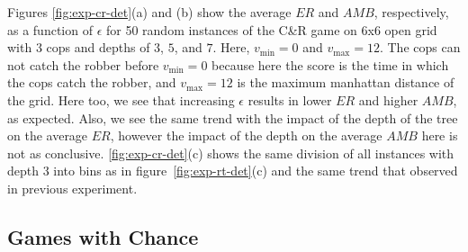 \documentclass[runningheads]{llncs}
\newcommand{\vmax}{v_{\text{max}}}
\newcommand{\vmin}{v_{\text{min}}}
\newcommand{\amb}{\mathit{AMB}}
\newcommand{\er}{\mathit{ER}}
\begin{document}
Figures \ref{fig:exp-cr-det}(a) and (b) show the average $\er$ and $\amb$, respectively, as a function of  $\epsilon$ for 50 random instances of the C\&R game on 6x6 open grid with 3 cops and depths of $3$, $5$, and $7$. Here, $\vmin=0$ and $\vmax=12$. The cops can not catch the robber before $\vmin=0$ because here the score is the time in which the cops catch the robber, and $\vmax=12$ is the maximum manhattan distance of the grid.
Here too, we see that increasing $\epsilon$ results in lower $\er$ and higher $\amb$, as expected. Also, we see the same trend with the impact of the depth of the tree on the average $\er$, however the impact of the depth  on the average $\amb$
here is not as conclusive. \ref{fig:exp-cr-det}(c) shows the same division of all instances with depth 3 into bins as in figure~\ref{fig:exp-rt-det}(c) and the same trend that observed in previous experiment. 

\subsection{Games with Chance}

\end{document}
